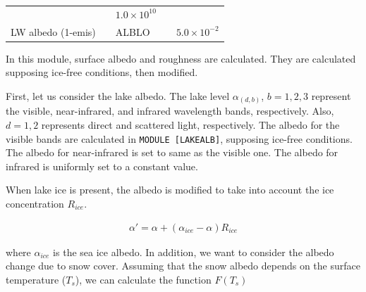 \begin{longtable}[]{@{}lllll@{}}
\begin{minipage}[t]{0.11\columnwidth}
\end{minipage} & \begin{minipage}[t]{0.04\columnwidth}\raggedright
\strut
\end{minipage} & \begin{minipage}[t]{0.37\columnwidth}\raggedright
\(1.0\times 10^{10}\)\strut
\end{minipage}\tabularnewline
\begin{minipage}[t]{0.19\columnwidth}\raggedright
LW albedo (1-emis)\strut
\end{minipage} & \begin{minipage}[t]{0.15\columnwidth}\raggedright
\strut
\end{minipage} & \begin{minipage}[t]{0.11\columnwidth}\raggedright
ALBLO\strut
\end{minipage} & \begin{minipage}[t]{0.04\columnwidth}\raggedright
\strut
\end{minipage} & \begin{minipage}[t]{0.37\columnwidth}\raggedright
\(5.0\times 10^{-2}\)\strut
\end{minipage}\tabularnewline
\bottomrule
\end{longtable}

In this module, surface albedo and roughness are calculated. They are
calculated supposing ice-free conditions, then modified.

First, let us consider the lake albedo. The lake level
\(\alpha_{(d,b)}\), \(b=1,2,3\) represent the visible, near-infrared,
and infrared wavelength bands, respectively. Also, \(d=1,2\) represents
direct and scattered light, respectively. The albedo for the visible
bands are calculated in \texttt{MODULE\ {[}LAKEALB{]}}, supposing
ice-free conditions. The albedo for near-infrared is set to same as the
visible one. The albedo for infrared is uniformly set to a constant
value.

When lake ice is present, the albedo is modified to take into account
the ice concentration \(R_{ice}\).

\begin{eqnarray}
    {\alpha'} = \alpha + (\alpha_{ice}-\alpha) R_{ice}
\end{eqnarray}

where \(\alpha_{ice}\) is the sea ice albedo. In addition, we want to
consider the albedo change due to snow cover. Assuming that the snow
albedo depends on the surface temperature (\(T_s\)), we can calculate
the function \(F(T_s)\)

